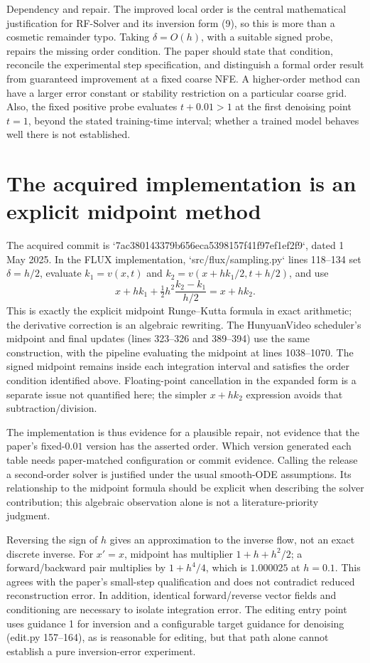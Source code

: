 \documentclass[10pt]{article}
\begin{document}
Dependency and repair. The improved local order is the central mathematical justification for RF-Solver and its inversion form (9), so this is more than a cosmetic remainder typo. Taking \(\delta=O(h)\), with a suitable signed probe, repairs the missing order condition. The paper should state that condition, reconcile the experimental step specification, and distinguish a formal order result from guaranteed improvement at a fixed coarse NFE. A higher-order method can have a larger error constant or stability restriction on a particular coarse grid. Also, the fixed positive probe evaluates \(t+0.01>1\) at the first denoising point \(t=1\), beyond the stated training-time interval; whether a trained model behaves well there is not established.\par
\section*{The acquired implementation is an explicit midpoint method}
The acquired commit is `7ac380143379b656eca5398157f41f97ef1ef2f9`, dated 1 May 2025. In the FLUX implementation, `src/flux/sampling.py` lines 118–134 set \(\delta=h/2\), evaluate \(k_1=v(x,t)\) and \(k_2=v(x+hk_1/2,t+h/2)\), and use \[x+h k_1+\tfrac12h^2\frac{k_2-k_1}{h/2}=x+h k_2.\] This is exactly the explicit midpoint Runge–Kutta formula in exact arithmetic; the derivative correction is an algebraic rewriting. The HunyuanVideo scheduler’s midpoint and final updates (lines 323–326 and 389–394) use the same construction, with the pipeline evaluating the midpoint at lines 1038–1070. The signed midpoint remains inside each integration interval and satisfies the order condition identified above. Floating-point cancellation in the expanded form is a separate issue not quantified here; the simpler \(x+hk_2\) expression avoids that subtraction/division.\par
The implementation is thus evidence for a plausible repair, not evidence that the paper’s fixed-\(0.01\) version has the asserted order. Which version generated each table needs paper-matched configuration or commit evidence. Calling the release a second-order solver is justified under the usual smooth-ODE assumptions. Its relationship to the midpoint formula should be explicit when describing the solver contribution; this algebraic observation alone is not a literature-priority judgment.\par
Reversing the sign of \(h\) gives an approximation to the inverse flow, not an exact discrete inverse. For \(x'=x\), midpoint has multiplier \(1+h+h^2/2\); a forward/backward pair multiplies by \(1+h^4/4\), which is \(1.000025\) at \(h=0.1\). This agrees with the paper’s small-step qualification and does not contradict reduced reconstruction error. In addition, identical forward/reverse vector fields and conditioning are necessary to isolate integration error. The editing entry point uses guidance 1 for inversion and a configurable target guidance for denoising (edit.py 157–164), as is reasonable for editing, but that path alone cannot establish a pure inversion-error experiment.\par
\end{document}
